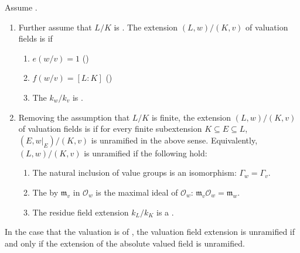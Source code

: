 \begin{definition} \label{definition:unramified_extension_of_valuation_fields}
    Assume . 
    \begin{enumerate}
        \item Further assume that $L/K$ is . The extension $(L,w)/(K,v)$ of valuation fields is  if 
        \begin{enumerate}
            \item $e(w/v) = 1$ ()
            \item $f(w/v) = [L:K]$ ()
            \item The   $k_w/k_v$ is .
        \end{enumerate}

        \item Removing the assumption that $L/K$ is finite, the extension $(L,w)/(K,v)$ of valuation fields is  if for every finite subextension $K \subseteq E \subseteq L$, $(E, w|_E) /(K,v)$ is unramified in the above sense. Equivalently, $(L,w)/(K,v)$ is unramified if the following hold:
        \begin{enumerate}
            \item The natural inclusion of value groups is an isomorphism: $\Gamma_w = \Gamma_v$.
            \item The  by $\mathfrak{m}_v$ in $\mathcal{O}_w$ is the maximal ideal of $\mathcal{O}_w$: $\mathfrak{m}_v \mathcal{O}_w = \mathfrak{m}_w$.
            \item The residue field extension $k_L/k_K$ is a .
        \end{enumerate}
    \end{enumerate}
    In the case that the valuation is of , the valuation field extension is unramified if and only if the extension of the  absolute valued field is unramified.
\end{definition}